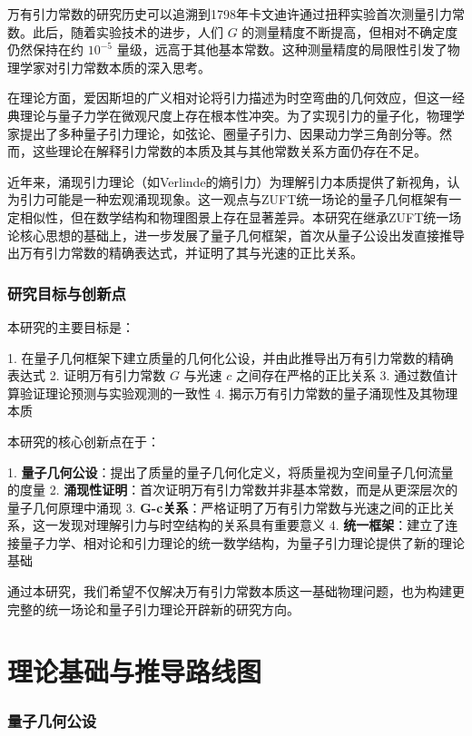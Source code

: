 \documentclass[12pt,twocolumn]{article}
\begin{document}
万有引力常数的研究历史可以追溯到1798年卡文迪许通过扭秤实验首次测量引力常数。此后，随着实验技术的进步，人们
 $G$ 的测量精度不断提高，但相对不确定度仍然保持在约 $10^{-5}$ 量级，远高于其他基本常数。这种测量精度的局限性引发了物理学家对引力常数本质的深入思考。

在理论方面，爱因斯坦的广义相对论将引力描述为时空弯曲的几何效应，但这一经典理论与量子力学在微观尺度上存在根本性冲突。为了实现引力的量子化，物理学家提出了多种量子引力理论，如弦论、圈量子引力、因果动力学三角剖分\cite{ambjorn2005}等。然而，这些理论在解释引力常数的本质及其与其他常数关系方面仍存在不足。

近年来，涌现引力理论（如Verlinde的熵引力\cite{verlinde2011}）为理解引力本质提供了新视角，认为引力可能是一种宏观涌现现象。这一观点与ZUFT统一场论的量子几何框架有一定相似性，但在数学结构和物理图景上存在显著差异。本研究在继承ZUFT统一场论核心思想的基础上，进一步发展了量子几何框架，首次从量子公设出发直接推导出万有引力常数的精确表达式，并证明了其与光速的正比关系。

\subsubsection{研究目标与创新点}

本研究的主要目标是：

1. 在量子几何框架下建立质量的几何化公设，并由此推导出万有引力常数的精确表达式
2. 证明万有引力常数 $G$ 与光速 $c$ 之间存在严格的正比关系
3. 通过数值计算验证理论预测与实验观测的一致性
4. 揭示万有引力常数的量子涌现性及其物理本质

本研究的核心创新点在于：

1. \textbf{量子几何公设}：提出了质量的量子几何化定义，将质量视为空间量子几何流量的度量
2. \textbf{涌现性证明}：首次证明万有引力常数并非基本常数，而是从更深层次的量子几何原理中涌现
3. \textbf{G-c关系}：严格证明了万有引力常数与光速之间的正比关系，这一发现对理解引力与时空结构的关系具有重要意义
4. \textbf{统一框架}：建立了连接量子力学、相对论和引力理论的统一数学结构，为量子引力理论提供了新的理论基础

通过本研究，我们希望不仅解决万有引力常数本质这一基础物理问题，也为构建更完整的统一场论和量子引力理论开辟新的研究方向。
\section{理论基础与推导路线图}

\subsubsection{量子几何公设}
\end{document}
